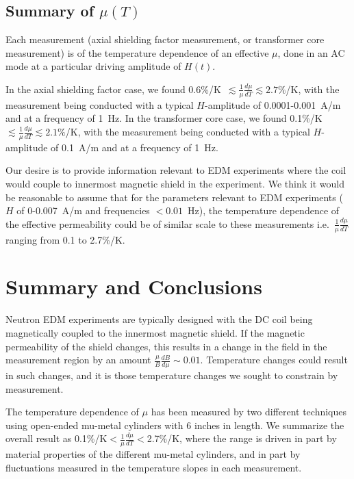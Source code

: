 \documentclass[review]{elsarticle}
\begin{document}






\subsection{Summary of $\mu(T)$}

Each measurement (axial shielding factor measurement, or transformer
core measurement) is of the temperature dependence of an effective
$\mu$, done in an AC mode at a particular driving amplitude of $H(t)$.

In the axial shielding factor case, we found
0.6\%/K~$\lesssim\frac{1}{\mu}\frac{d\mu}{dT}\lesssim 2.7\%$/K, with
the measurement being conducted with a typical $H$-amplitude of 0.0001-0.001~A/m
and at a frequency of 1~Hz.  In the transformer core case, we found
0.1\%/K~$\lesssim\frac{1}{\mu}\frac{d\mu}{dT}\lesssim 2.1\%$/K, with
the measurement being conducted with a typical $H$-amplitude of
0.1~A/m and at a frequency of 1~Hz.

Our desire is to provide information relevant to EDM experiments where
the coil would couple to innermost magnetic shield in the experiment.
We think it would be reasonable to assume that for the parameters
relevant to EDM experiments ($H$ of 0-0.007~A/m and frequencies
$<0.01$~Hz), the temperature dependence of the effective permeability
could be of similar scale to these measurements
i.e.~$\frac{1}{\mu}\frac{d\mu}{dT}$ ranging from 0.1 to 2.7\%/K.

\section{Summary and Conclusions}


Neutron EDM experiments are typically designed with the DC coil being
magnetically coupled to the innermost magnetic shield.  If the
magnetic permeability of the shield changes, this results in a change
in the field in the measurement region by an amount
$\frac{\mu}{B}\frac{dB}{d\mu}\sim 0.01$.  Temperature changes could
result in such changes, and it is those temperature changes we sought
to constrain by measurement.

The temperature dependence of $\mu$ has been measured by two different
techniques using open-ended mu-metal cylinders with 6 inches in
length.  We summarize the overall result as
0.1\%/K$<\frac{1}{\mu}\frac{d\mu}{dT}<$2.7\%/K, where the range is
driven in part by material properties of the different mu-metal
cylinders, and in part by fluctuations measured in the temperature
slopes in each measurement.
\end{document}
